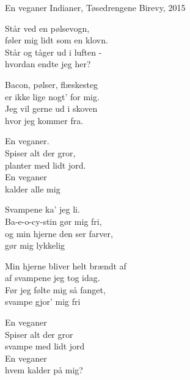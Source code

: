 \begin{song}{En veganer}
  {} %
  {Indianer, Tøsedrengene} %
  {} %
  {Birevy, 2015} %
  {\NotCCLIed} %

  \begin{SBVerse}
    Står ved en pølsevogn,\\
    føler mig lidt som en klovn.\\
    Står og tåger ud i luften -\\
    hvordan endte jeg her?
  \end{SBVerse}

  \begin{SBVerse}
    Bacon, pølser, flæskesteg\\
    er ikke lige nogt’ for mig.\\
    Jeg vil gerne ud i skoven\\
    hvor jeg kommer fra.
  \end{SBVerse}

  \begin{SBChorus}
    En veganer.\\
    Spiser alt der gror,\\
    planter med lidt jord.\\
    En veganer\\
    kalder alle mig
  \end{SBChorus}

  \begin{SBVerse}
    Svampene ka’ jeg li.\\
    Ba-e-o-cy-stin gør mig fri,\\
    og min hjerne den ser farver,\\
    gør mig lykkelig
  \end{SBVerse}

  \begin{SBVerse}
    Min hjerne bliver helt brændt af\\
    af svampene jeg tog idag.\\
    Før jeg følte mig så fanget,\\
    svampe gjor’ mig fri
  \end{SBVerse}

  \begin{SBChorus}
    En veganer\\
    Spiser alt der gror\\
    svampe med lidt jord\\
    En veganer\\
    hvem kalder på mig?
  \end{SBChorus}


\end{song}
